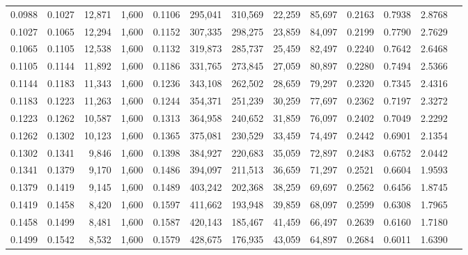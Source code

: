 \begin{tabular}{rrrrrrrrrrrrr}
0.0988 & 0.1027 & 12,871 & 1,600 &                                     0.1106 & 295,041 & 310,569 &  22,259 &  85,697 & 0.2163 & 0.7938 & 2.8768 \\
0.1027 & 0.1065 & 12,294 & 1,600 &                                     0.1152 & 307,335 & 298,275 &  23,859 &  84,097 & 0.2199 & 0.7790 & 2.7629 \\
0.1065 & 0.1105 & 12,538 & 1,600 &                                     0.1132 & 319,873 & 285,737 &  25,459 &  82,497 & 0.2240 & 0.7642 & 2.6468 \\
0.1105 & 0.1144 & 11,892 & 1,600 &                                     0.1186 & 331,765 & 273,845 &  27,059 &  80,897 & 0.2280 & 0.7494 & 2.5366 \\
0.1144 & 0.1183 & 11,343 & 1,600 &                                     0.1236 & 343,108 & 262,502 &  28,659 &  79,297 & 0.2320 & 0.7345 & 2.4316 \\
0.1183 & 0.1223 & 11,263 & 1,600 &                                     0.1244 & 354,371 & 251,239 &  30,259 &  77,697 & 0.2362 & 0.7197 & 2.3272 \\
0.1223 & 0.1262 & 10,587 & 1,600 &                                     0.1313 & 364,958 & 240,652 &  31,859 &  76,097 & 0.2402 & 0.7049 & 2.2292 \\
0.1262 & 0.1302 & 10,123 & 1,600 &                                     0.1365 & 375,081 & 230,529 &  33,459 &  74,497 & 0.2442 & 0.6901 & 2.1354 \\
0.1302 & 0.1341 &  9,846 & 1,600 &                                     0.1398 & 384,927 & 220,683 &  35,059 &  72,897 & 0.2483 & 0.6752 & 2.0442 \\
0.1341 & 0.1379 &  9,170 & 1,600 &                                     0.1486 & 394,097 & 211,513 &  36,659 &  71,297 & 0.2521 & 0.6604 & 1.9593 \\
0.1379 & 0.1419 &  9,145 & 1,600 &                                     0.1489 & 403,242 & 202,368 &  38,259 &  69,697 & 0.2562 & 0.6456 & 1.8745 \\
0.1419 & 0.1458 &  8,420 & 1,600 &                                     0.1597 & 411,662 & 193,948 &  39,859 &  68,097 & 0.2599 & 0.6308 & 1.7965 \\
0.1458 & 0.1499 &  8,481 & 1,600 &                                     0.1587 & 420,143 & 185,467 &  41,459 &  66,497 & 0.2639 & 0.6160 & 1.7180 \\
0.1499 & 0.1542 &  8,532 & 1,600 &                                     0.1579 & 428,675 & 176,935 &  43,059 &  64,897 & 0.2684 & 0.6011 & 1.6390 \\

\end{tabular}
